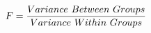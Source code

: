 \documentclass[preview]{standalone}
\begin{document}
\begin{align*}
\special{dvisvgm:raw <g id='unique000'>}F = \frac{Variance\ Between\ Groups}{Variance\ Within\ Groups}\special{dvisvgm:raw </g>}
\end{align*}
\end{document}
